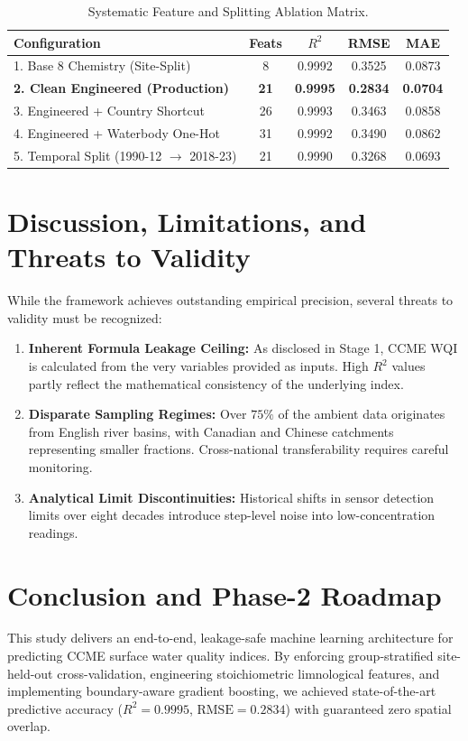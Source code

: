 \documentclass[journal,10pt,twocolumn]{IEEEtran}
\begin{document}
\begin{table}[h]
\centering
\caption{Systematic Feature and Splitting Ablation Matrix.}
\label{tab:ablation}
\begin{tabular}{lcccc}
\toprule
\textbf{Configuration} & \textbf{Feats} & \textbf{$R^2$} & \textbf{RMSE} & \textbf{MAE} \\
\midrule
1. Base 8 Chemistry (Site-Split) & 8 & 0.9992 & 0.3525 & 0.0873 \\
\textbf{2. Clean Engineered (Production)} & \textbf{21} & \textbf{0.9995} & \textbf{0.2834} & \textbf{0.0704} \\
3. Engineered + Country Shortcut & 26 & 0.9993 & 0.3463 & 0.0858 \\
4. Engineered + Waterbody One-Hot & 31 & 0.9992 & 0.3490 & 0.0862 \\
5. Temporal Split (1990-12 $\to$ 2018-23) & 21 & 0.9990 & 0.3268 & 0.0693 \\
\bottomrule
\end{tabular}
\end{table}

\section{Discussion, Limitations, and Threats to Validity}
While the framework achieves outstanding empirical precision, several threats to validity must be recognized:
\begin{enumerate}
    \item \textbf{Inherent Formula Leakage Ceiling:} As disclosed in Stage 1, CCME WQI is calculated from the very variables provided as inputs. High $R^2$ values partly reflect the mathematical consistency of the underlying index.
    \item \textbf{Disparate Sampling Regimes:} Over $75\%$ of the ambient data originates from English river basins, with Canadian and Chinese catchments representing smaller fractions. Cross-national transferability requires careful monitoring.
    \item \textbf{Analytical Limit Discontinuities:} Historical shifts in sensor detection limits over eight decades introduce step-level noise into low-concentration readings.
\end{enumerate}

\section{Conclusion and Phase-2 Roadmap}
This study delivers an end-to-end, leakage-safe machine learning architecture for predicting CCME surface water quality indices. By enforcing group-stratified site-held-out cross-validation, engineering stoichiometric limnological features, and implementing boundary-aware gradient boosting, we achieved state-of-the-art predictive accuracy ($R^2 = 0.9995$, $\text{RMSE} = 0.2834$) with guaranteed zero spatial overlap.
\end{document}
